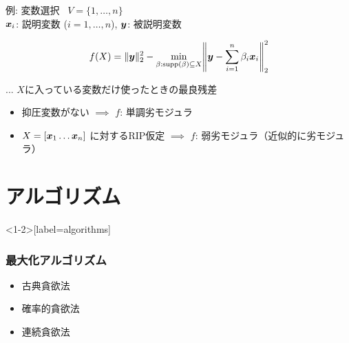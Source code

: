 \documentclass[14pt,aspectratio=169,xcolor=dvipsnames,table,onlytextwidth,dvipdfmx]{beamer}
\begin{document}
\begin{frame}{例: 変数選択~\cite{Das2011,Elenberg2018}}
    $V = \{1, \dots, n\}$ \\
    $\boldsymbol{x}_i$: 説明変数 ($i = 1,\dots, n$), $\boldsymbol{y}$: 被説明変数

    \begin{block}{}
        \[
        f(X) = \norm{\by}_2^2 - \min_{\beta:\supp(\beta) \subseteq X} \norm*{ \by - \sum_{i=1}^n \beta_i \bx_i }_2^2
        \]
    \end{block}
    \hfill ... $X$に入っている変数だけ使ったときの最良残差

    \vfill
    \begin{itemize}
        \item 抑圧変数がない $\implies$ $f$: 単調劣モジュラ
        \item $X = [\boldsymbol{x}_1 \dots \boldsymbol{x}_n]$ に対するRIP仮定 $\implies$ $f$: 弱劣モジュラ（近似的に劣モジュラ）
    \end{itemize}
\end{frame}

\section{アルゴリズム}

\begin{frame}<1-2>[label=algorithms]
    \frametitle{最大化アルゴリズム}

    \begin{itemize}
        \item \alert<2>{古典貪欲法}~\cite{Nemhauser1978}
        \item \alert<2>{確率的貪欲法}~\cite{Mirzasoleiman2015}
    \end{itemize}

    \vfill
    \begin{itemize}
        \item \alert<3>{連続貪欲法}~\cite{Calinescu2011,Chekuri2010,Vondrak2014}
    \end{itemize}
\end{frame}
\end{document}
